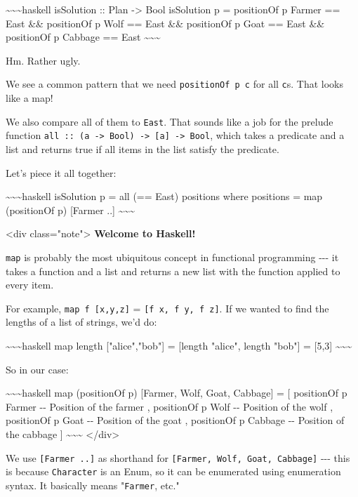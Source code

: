 \documentclass[]{article}
\begin{document}
\textasciitilde{}\textasciitilde{}\textasciitilde{}haskell isSolution :: Plan
-\textgreater{} Bool isSolution p = positionOf p Farmer == East \&\& positionOf
p Wolf == East \&\& positionOf p Goat == East \&\& positionOf p Cabbage == East
\textasciitilde{}\textasciitilde{}\textasciitilde{}

Hm. Rather ugly.

We see a common pattern that we need \texttt{positionOf\ p\ c} for all
\texttt{c}s. That looks like a map!

We also compare all of them to \texttt{East}. That sounds like a job for the
prelude function
\texttt{all\ ::\ (a\ -\textgreater{}\ Bool)\ -\textgreater{}\ {[}a{]}\ -\textgreater{}\ Bool},
which takes a predicate and a list and returns true if all items in the list
satisfy the predicate.

Let's piece it all together:

\textasciitilde{}\textasciitilde{}\textasciitilde{}haskell isSolution p = all
(== East) positions where positions = map (positionOf p) {[}Farmer ..{]}
\textasciitilde{}\textasciitilde{}\textasciitilde{}

\textless{}div class="note"\textgreater{} \textbf{Welcome to Haskell!}

\texttt{map} is probably the most ubiquitous concept in functional programming
-\/-\/- it takes a function and a list and returns a new list with the function
applied to every item.

For example, \texttt{map\ f\ {[}x,y,z{]}} = \texttt{{[}f\ x,\ f\ y,\ f\ z{]}}.
If we wanted to find the lengths of a list of strings, we'd do:

\textasciitilde{}\textasciitilde{}\textasciitilde{}haskell map length
{[}"alice","bob"{]} = {[}length "alice", length "bob"{]} = {[}5,3{]}
\textasciitilde{}\textasciitilde{}\textasciitilde{}

So in our case:

\textasciitilde{}\textasciitilde{}\textasciitilde{}haskell map (positionOf p)
{[}Farmer, Wolf, Goat, Cabbage{]} = {[} positionOf p Farmer -\/- Position of the
farmer , positionOf p Wolf -\/- Position of the wolf , positionOf p Goat -\/-
Position of the goat , positionOf p Cabbage -\/- Position of the cabbage {]}
\textasciitilde{}\textasciitilde{}\textasciitilde{}
\textless{}/div\textgreater{}

We use \texttt{{[}Farmer\ ..{]}} as shorthand for
\texttt{{[}Farmer,\ Wolf,\ Goat,\ Cabbage{]}} -\/-\/- this is because
\texttt{Character} is an Enum, so it can be enumerated using enumeration syntax.
It basically means "\texttt{Farmer}, etc."
\end{document}
